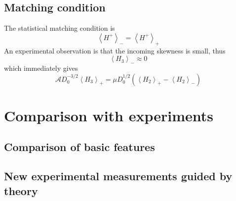 \documentclass[11pt]{article}
\newcommand{\mean}[1]{\left< #1 \right>}
\newcommand{\ampp}{\mathcal{A}}
\newcommand{\Hp}{H^{+}}
\newcommand{\meanp}[1]{\mean{#1}_{+}}
\newcommand{\meanm}[1]{\mean{#1}_{-}}
\begin{document}
\subsection{Matching condition}

The statistical matching condition is
\begin{equation}
\meanm{\Hp} = \meanp{\Hp}
\end{equation}
An experimental observation is that the incoming skewness is small, thus
\begin{equation}
\meanm{H_3} \approx 0
\end{equation}
which immediately gives
\begin{equation}
\ampp D_0^{-3/2} \meanp{H_3} = \mu D_0^{1/2} \left( \meanp{H_2} - \meanm{H_2} \right)
\end{equation}


\section{Comparison with experiments}

\subsection{Comparison of basic features}

\subsection{New experimental measurements guided by theory}

%
%
\end{document}

